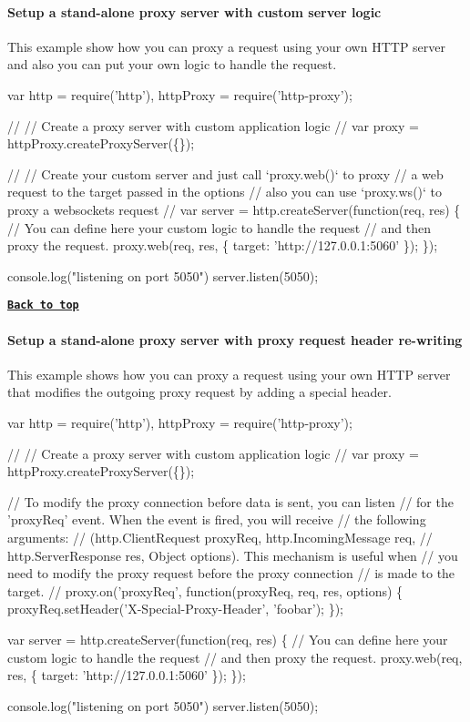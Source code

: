 \paragraph*{Setup a stand-\/alone proxy server with custom server logic}

This example show how you can proxy a request using your own H\+T\+TP server and also you can put your own logic to handle the request.


\begin{DoxyCode}
var http = require('http'),
    httpProxy = require('http-proxy');

//
// Create a proxy server with custom application logic
//
var proxy = httpProxy.createProxyServer(\{\});

//
// Create your custom server and just call `proxy.web()` to proxy
// a web request to the target passed in the options
// also you can use `proxy.ws()` to proxy a websockets request
//
var server = http.createServer(function(req, res) \{
  // You can define here your custom logic to handle the request
  // and then proxy the request.
  proxy.web(req, res, \{ target: 'http://127.0.0.1:5060' \});
\});

console.log("listening on port 5050")
server.listen(5050);
\end{DoxyCode}


{\bfseries \href{#table-of-contents}{\tt Back to top}}

\paragraph*{Setup a stand-\/alone proxy server with proxy request header re-\/writing}

This example shows how you can proxy a request using your own H\+T\+TP server that modifies the outgoing proxy request by adding a special header.


\begin{DoxyCode}
var http = require('http'),
    httpProxy = require('http-proxy');

//
// Create a proxy server with custom application logic
//
var proxy = httpProxy.createProxyServer(\{\});

// To modify the proxy connection before data is sent, you can listen
// for the 'proxyReq' event. When the event is fired, you will receive
// the following arguments:
// (http.ClientRequest proxyReq, http.IncomingMessage req,
//  http.ServerResponse res, Object options). This mechanism is useful when
// you need to modify the proxy request before the proxy connection
// is made to the target.
//
proxy.on('proxyReq', function(proxyReq, req, res, options) \{
  proxyReq.setHeader('X-Special-Proxy-Header', 'foobar');
\});

var server = http.createServer(function(req, res) \{
  // You can define here your custom logic to handle the request
  // and then proxy the request.
  proxy.web(req, res, \{
    target: 'http://127.0.0.1:5060'
  \});
\});

console.log("listening on port 5050")
server.listen(5050);
\end{DoxyCode}


